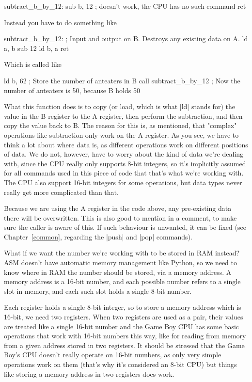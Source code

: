 \documentclass[11pt]{book}
\begin{document}
\begin{code}
subtract_b_by_12:
    sub b, 12 ; doesn't work, the CPU has no such command 
    ret 
\end{code}

Instead you have to do something like 

\begin{code}
subtract_b_by_12:
    ; Input and output on B. Destroys any existing data on A.
    ld a, b 
    sub 12 
    ld b, a
    ret 
\end{code}

Which is called like 

\begin{code}
ld b, 62 ; Store the number of anteaters in B
call subtract_b_by_12 
; Now the number of anteaters is 50, because B holds 50
\end{code}

What this function does is to copy (or load, which is what |ld| stands for) the value in the B register to the A register, then perform the subtraction, and then copy the value back to B. The reason for this is, as mentioned, that "complex" operations like subtraction only work on the A register. As you see, we have to think a lot about where data is, as different operations work on different positions of data. We do not, however, have to worry about the kind of data we're dealing with, since the CPU really only supports 8-bit integers, so it's implicitly assumed for all commands used in this piece of code that that's what we're working with. The CPU also support 16-bit integers for some operations, but data types never really get more complicated than that.

Because we are using the A register in the code above, any pre-existing data there will be overwritten. This is also good to mention in a comment, to make sure the caller is aware of this. If such behaviour is unwanted, it can be fixed (see Chapter~\ref{common}, regarding the |push| and |pop| commands).

What if we want the number we're working with to be stored in RAM instead? ASM doesn't have automatic memory management like Python, so we need to know where in RAM the number should be stored, via a memory address. A memory address is a 16-bit number, and each possible number refers to a single slot in memory, and each such slot holds a single 8-bit number. 

Each register holds a single 8-bit integer, so to store a memory address which is 16-bit, we need two registers. When two registers are used as a pair, their values are treated like a single 16-bit number and the Game Boy CPU has some basic operations that work with 16-bit numbers this way, like for reading from memory from a given address stored in two registers. It should be stressed that the Game Boy's CPU doesn't really operate on 16-bit numbers, as only very simple operations work on them (that's why it's considered an 8-bit CPU) but things like storing a memory address in two registers does work.
\end{document}
